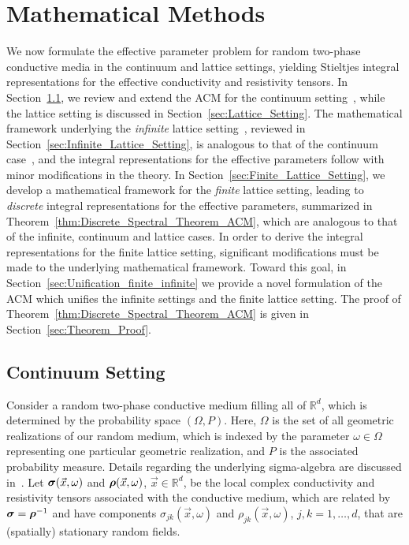\documentclass{cmslatex}
\newcommand\bsig{\mbox{\boldmath${\sigma}$}}
\newcommand\brho{\mbox{\boldmath${\rho}$}}
\begin{document}
    

\section{Mathematical Methods}\label{sec:Mathematical_Methods} 
%
We now formulate the effective parameter problem for random
two-phase conductive media in the continuum and lattice settings,
yielding Stieltjes integral representations for the effective
conductivity and resistivity tensors. In 
Section~\ref{sec:Continuum_Setting}, we review and extend the ACM for the
continuum setting~\cite{Golden:CMP-473}, while the lattice setting is
discussed in Section~\ref{sec:Lattice_Setting}. The mathematical
framework underlying the \emph{infinite} lattice
setting~\cite{Bruno:JSP-365,Golden:CMP-467}, reviewed in  
Section~\ref{sec:Infinite_Lattice_Setting}, is analogous to that of
the continuum case~\cite{Bruno:JSP-365}, and the integral
representations for the effective parameters follow with minor
modifications in the theory. In
Section~\ref{sec:Finite_Lattice_Setting}, we develop a mathematical 
framework for the \emph{finite} lattice setting, leading to
\emph{discrete} integral representations for the effective parameters,
summarized in Theorem~\ref{thm:Discrete_Spectral_Theorem_ACM}, which
are analogous to that of the infinite, continuum and lattice cases. In
order to derive the integral representations for the finite lattice
setting, significant modifications must be made to the underlying
mathematical framework. Toward this goal, in
Section~\ref{sec:Unification_finite_infinite} we provide a novel
formulation of the ACM which unifies the infinite settings and the
finite lattice setting. The proof of
Theorem~\ref{thm:Discrete_Spectral_Theorem_ACM} is given in
Section~\ref{sec:Theorem_Proof}.     



\subsection{Continuum Setting}\label{sec:Continuum_Setting}
%
Consider a random two-phase conductive medium filling all of
$\mathbb{R}^d$, which is determined by the probability space
$(\Omega,P)$. Here, $\Omega$ is the set of all  geometric realizations of our
random medium, which is indexed by the parameter $\omega\in\Omega$ representing
one particular geometric realization, and $P$ is the associated
probability measure. Details regarding the underlying sigma-algebra
are discussed in~\cite{Papanicolaou:RF-835}. Let $\bsig(\vec{x},\omega)$
and $\brho(\vec{x},\omega)$, $\vec{x}\in\mathbb{R}^d$, be the local complex
conductivity and resistivity tensors associated with the conductive
medium, which are related by $\bsig=\brho^{-1}$ and have components
$\sigma_{jk}(\vec{x},\omega)$ and $\rho_{jk}(\vec{x},\omega)$, $j,k=1,\ldots,d$, that are
(spatially) stationary random fields. 
\end{document}
